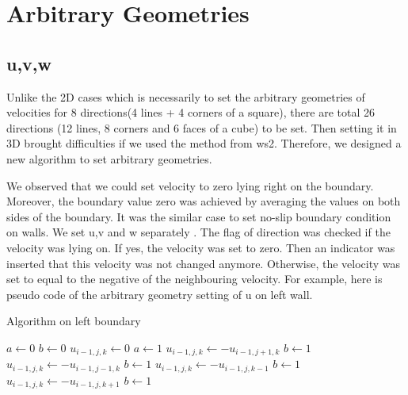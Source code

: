 \documentclass{article}%
\begin{document}
\section{Arbitrary Geometries}
\subsection{u,v,w}
Unlike the 2D cases which is necessarily to set the arbitrary geometries of velocities for 8 directions(4 lines + 4 corners of a square), there are total 26 directions (12 lines, 8 corners and 6 faces of a cube) to be set. Then setting it in 3D brought difficulties if we used the method from ws2.  Therefore, we designed a new algorithm to set arbitrary geometries.

We observed that we could set velocity to zero lying right on the boundary. Moreover, the boundary value zero was achieved by averaging the values on both sides of the boundary. It was the similar case to set no-slip boundary condition on walls.  We set u,v and w separately . The flag of direction was checked if the velocity was lying on. If yes, the velocity was set to zero. Then an indicator was inserted that this velocity was not changed anymore. Otherwise, the velocity was set to equal to the negative of the neighbouring velocity.  For example, here is pseudo code of the arbitrary geometry setting of u on left wall.

\begin{algorithm}
\caption{Algorithm on left boundary}\label{euclid}
\begin{algorithmic}
	\State $a\gets 0$
	\State $b\gets 0$ 
    		\State $u_{i-1,j,k}\gets 0$
    		\State $a\gets 1$
    	\EndIf
    			\State $u_{i-1,j,k}\gets -u_{i-1,j+1,k}$
    			\State $b\gets 1$
    		\EndIf	
    	\EndIf
    			\State $u_{i-1,j,k}\gets -u_{i-1,j-1,k}$
    			\State $b\gets 1$
    		\EndIf	
    	\EndIf 
    			\State $u_{i-1,j,k}\gets -u_{i-1,j,k-1}$
    			\State $b\gets 1$
    		\EndIf	
    	\EndIf    	   	
    			\State $u_{i-1,j,k}\gets -u_{i-1,j,k+1}$
    			\State $b\gets 1$
    		\EndIf	
    	\EndIf       	
\EndIf
\EndFor
\end{algorithmic}
\end{algorithm}
\end{document}
